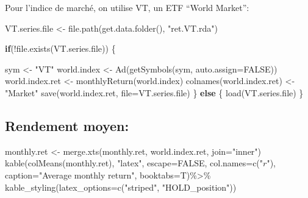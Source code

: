 \documentclass[
]{article}
\newenvironment{Shaded}{\begin{snugshade}}{\end{snugshade}}
\newcommand{\AttributeTok}[1]{\textcolor[rgb]{0.77,0.63,0.00}{#1}}
\newcommand{\ConstantTok}[1]{\textcolor[rgb]{0.00,0.00,0.00}{#1}}
\newcommand{\ControlFlowTok}[1]{\textcolor[rgb]{0.13,0.29,0.53}{\textbf{#1}}}
\newcommand{\FunctionTok}[1]{\textcolor[rgb]{0.00,0.00,0.00}{#1}}
\newcommand{\NormalTok}[1]{#1}
\newcommand{\OtherTok}[1]{\textcolor[rgb]{0.56,0.35,0.01}{#1}}
\newcommand{\SpecialCharTok}[1]{\textcolor[rgb]{0.00,0.00,0.00}{#1}}
\newcommand{\StringTok}[1]{\textcolor[rgb]{0.31,0.60,0.02}{#1}}
\begin{document}
Pour l'indice de marché, on utilise VT, un ETF ``World Market'':

\begin{Shaded}
\begin{Highlighting}[]
\NormalTok{VT.series.file }\OtherTok{\textless{}{-}} \FunctionTok{file.path}\NormalTok{(}\FunctionTok{get.data.folder}\NormalTok{(), }\StringTok{"ret.VT.rda"}\NormalTok{)}

\ControlFlowTok{if}\NormalTok{(}\SpecialCharTok{!}\FunctionTok{file.exists}\NormalTok{(VT.series.file)) \{}
  
\NormalTok{sym }\OtherTok{\textless{}{-}} \StringTok{"VT"}
\NormalTok{world.index }\OtherTok{\textless{}{-}} \FunctionTok{Ad}\NormalTok{(}\FunctionTok{getSymbols}\NormalTok{(sym, }\AttributeTok{auto.assign=}\ConstantTok{FALSE}\NormalTok{))}
\NormalTok{world.index.ret }\OtherTok{\textless{}{-}} \FunctionTok{monthlyReturn}\NormalTok{(world.index)}
\FunctionTok{colnames}\NormalTok{(world.index.ret) }\OtherTok{\textless{}{-}} \StringTok{"Market"}
\FunctionTok{save}\NormalTok{(world.index.ret, }\AttributeTok{file=}\NormalTok{VT.series.file)}
\NormalTok{\} }\ControlFlowTok{else}\NormalTok{ \{}
  \FunctionTok{load}\NormalTok{(VT.series.file)}
\NormalTok{\}}
\end{Highlighting}
\end{Shaded}

\hypertarget{rendement-moyen}{%
\subsection{Rendement moyen:}\label{rendement-moyen}}

\begin{Shaded}
\begin{Highlighting}[]
\NormalTok{monthly.ret }\OtherTok{\textless{}{-}} \FunctionTok{merge.xts}\NormalTok{(monthly.ret, world.index.ret, }\AttributeTok{join=}\StringTok{"inner"}\NormalTok{)}
\FunctionTok{kable}\NormalTok{(}\FunctionTok{colMeans}\NormalTok{(monthly.ret), }\StringTok{"latex"}\NormalTok{, }\AttributeTok{escape=}\ConstantTok{FALSE}\NormalTok{, }\AttributeTok{col.names=}\FunctionTok{c}\NormalTok{(}\StringTok{"$r$"}\NormalTok{), }\AttributeTok{caption=}\StringTok{"Average monthly return"}\NormalTok{, }\AttributeTok{booktabs=}\NormalTok{T)}\SpecialCharTok{\%\textgreater{}\%} \FunctionTok{kable\_styling}\NormalTok{(}\AttributeTok{latex\_options=}\FunctionTok{c}\NormalTok{(}\StringTok{"striped"}\NormalTok{, }\StringTok{"HOLD\_position"}\NormalTok{))}
\end{Highlighting}
\end{Shaded}
\end{document}
